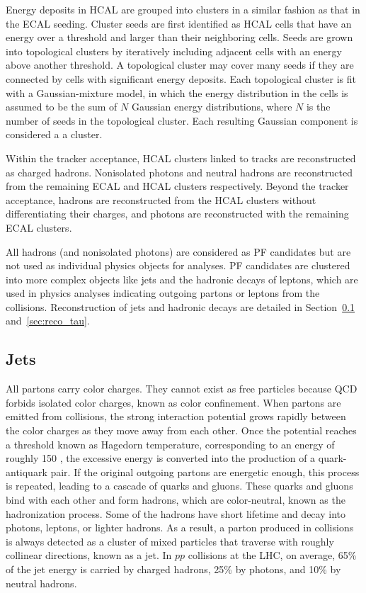 Energy deposits in HCAL are grouped into clusters in a similar fashion as that in the ECAL seeding.
Cluster seeds are first identified as HCAL cells that have an energy over a threshold and larger than their neighboring cells.
Seeds are grown into topological clusters by iteratively including adjacent cells with an energy above another threshold.
A topological cluster may cover many seeds if they are connected by cells with significant energy deposits.
Each topological cluster is fit with a Gaussian-mixture model, in which the energy distribution in the cells is assumed to be 
the sum of $N$ Gaussian energy distributions, where $N$ is the number of seeds in the topological cluster.
Each resulting Gaussian component is considered a a cluster.

Within the tracker acceptance, HCAL clusters linked to tracks are reconstructed as charged hadrons. 
Nonisolated photons and neutral hadrons are reconstructed from the remaining ECAL and HCAL clusters respectively.
Beyond the tracker acceptance, hadrons are reconstructed from the HCAL clusters without differentiating their charges,
and photons are reconstructed with the remaining ECAL clusters.

All hadrons (and nonisolated photons) are considered as PF candidates but are not used as individual physics objects for analyses.
PF candidates are clustered into more complex objects like jets and the hadronic decays of \tau{} leptons,
which are used in physics analyses indicating outgoing partons or \tau{} leptons from the collisions.  
Reconstruction of jets and hadronic \tau{} decays are detailed in Section~\ref{sec:reco_jet} and~\ref{sec:reco_tau}.


\subsection{Jets}\label{sec:reco_jet}

All partons carry color charges. 
They cannot exist as free particles because QCD forbids isolated color charges, known as color confinement.
When partons are emitted from collisions, the strong interaction potential grows rapidly between the color charges as they move away from each other.
Once the potential reaches a threshold known as Hagedorn temperature, corresponding to an energy of roughly 150 \MeV,
the excessive energy is converted into the production of a quark-antiquark pair. 
If the original outgoing partons are energetic enough, this process is repeated, leading to a cascade of quarks and gluons.
These quarks and gluons bind with each other and form hadrons, which are color-neutral, known as the hadronization process.
Some of the hadrons have short lifetime and decay into photons, leptons, or lighter hadrons.
As a result, a parton produced in collisions is always detected as a cluster of mixed particles that traverse with roughly collinear directions, known as a jet.
In $pp$ collisions at the LHC, on average, 65\% of the jet energy is carried by charged hadrons, 25\% by photons, and 10\% by neutral hadrons.

